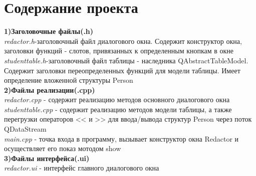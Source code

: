 \documentclass[a4paper]{article}
\begin{document}
          
\newpage
{\section{Содержание проекта}
        \hfill\break
        \hfill\break
{\bf 1)Заголовочные файлы(.h)}\\
        \hfill\break
        \textit{redactor.h}-заголовочный файл диалогового окна. Содержит конструктор окна, заголовки функций - слотов, привязанных к определенным кнопкам в окне\\        
        \hfill\break
        \textit{studenttable.h}-заголовочный файл таблицы - наследника QAbstractTableModel. Содержит заголовки переопределенных функций для модели таблицы. Имеет определение вложенной структуры Person\\
        \hfill\break
        \hfill\break
{\bf 2)Файлы реализации(.cpp)}\\
        \hfill\break
        \textit{redactor.cpp} - содержит реализацию методов основного диалогового окна\\
        \hfill\break     
        \textit{studenttable.cpp} - содержит реализацию методов модели таблицы, а также перегрузки операторов << и >> для ввода/вывода структур Person через поток QDataStream\\        
        \hfill\break
        \textit{main.cpp} - точка входа в программу, вызывает конструктор окна Redactor и осуществляет его показ мотодом show\\
        \hfill\break
        \hfill\break
{\bf 3)Файлы интерфейса(.ui)}\\ 
       \hfill\break
       \textit{redactor.ui} - интерфейс главного диалогового окна\\
       \hfill\break
       \hfill\break       
}
	
	\newpage %
	
	\newpage %
	
\end{document}
